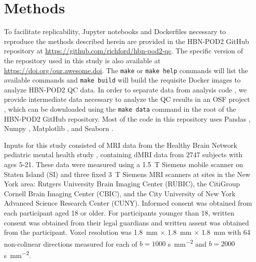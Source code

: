 \documentclass[fleqn,10pt]{wlscirep}
\begin{document}

\section*{Methods}

To facilitate replicability, Jupyter notebooks \cite{kluyver2016jupyter} and
Dockerfiles \cite{merkel2014docker} necessary to reproduce the methods described
herein are provided in the HBN-POD2 GitHub repository at
\url{https://github.com/richford/hbn-pod2-qc}. The specific version of the
repository used in this study is also available at
\url{https://doi.org/our.awesome.doi}. The \texttt{make} or \texttt{make help}
commands will list the available commands and \texttt{make build} will build the
requisite Docker images to analyze HBN-POD2 QC data. In order to separate data
from analysis code \cite{Wilson2017-rj}, we provide intermediate data necessary
to analyze the QC results in an OSF \cite{Foster-MSLS2017-rl} project
\cite{hbn-pod2-osf}, which can be downloaded using the \texttt{make data}
command in the root of the HBN-POD2 GitHub repository. Most of the code in this
repository uses Pandas \cite{mckinney-proc-scipy-2010,reback2020pandas}, Numpy
\cite{harris2020array}, Matplotlib \cite{hunter2007matplotlib}, and Seaborn
\cite{waskom2021seaborn}.

Inputs for this study consisted of MRI data from the Healthy Brain Network
pediatric mental health study \cite{alexander2017-yc}, containing dMRI data from
\num{2747} subjects with ages 5-21. These data were measured using a
\qty{1.5}{\tesla} Siemens mobile scanner on Staten Island (SI) and three fixed
\qty{3}{\tesla} Siemens MRI scanners at sites in the New York area: Rutgers
University Brain Imaging Center (RUBIC), the CitiGroup Cornell Brain Imaging
Center (CBIC), and the City University of New York Advanced Science Research
Center (CUNY). Informed consent was obtained from each participant aged 18 or
older. For participants younger than 18, written consent was obtained from their
legal guardians and written assent was obtained from the participant. Voxel
resolution was \qty{1.8}{\mm} $\times$ \qty{1.8}{\mm} $\times$ \qty{1.8}{\mm} with \num{64} non-colinear
directions measured for each of $b=1000$ \unit{\second \per \mm^{2}} and
$b=2000$ \unit{\second \per \mm^{2}}.
\end{document}

